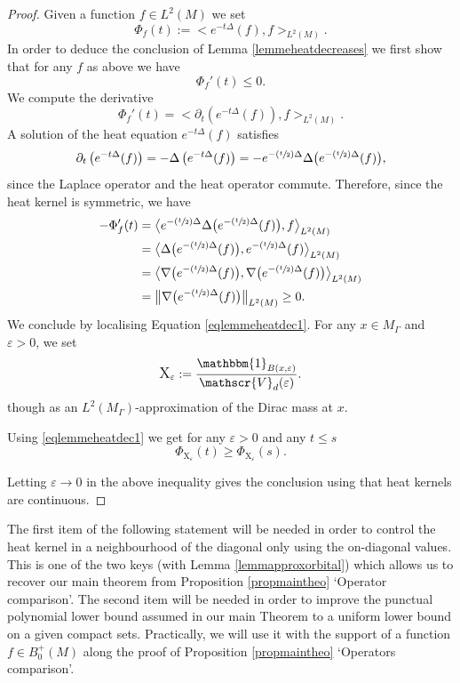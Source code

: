 \documentclass[10pt]{amsart}
\let\mathcal\mathscr
\let\epsilon\varepsilon
\newcommand{\Psfrac}[2]{(\sfrac{#1}{#2})}
\theoremstyle{plain}
\theoremstyle{definition}
\begin{document}
\begin{proof}
Given a function $f \in L^2(M)$ we set
\[
\Phi_f(t) := \bigl< e^{-t\Delta}(f),f \bigr>_{L^2(M)}.
\]
In order to deduce the conclusion of Lemma \ref{lemmeheatdecreases} we first show that for any $f$ as above we have
\begin{equation}
\label{eqlemmeheatdec1}
\Phi_f'(t) \le 0.
\end{equation}
We compute the derivative
\[
\Phi_f'(t) = \bigl< \partial_t \left(e^{-t\Delta} (f)\right),f \bigr>_{L^2(M)}.
\]
A solution of the heat equation $e^{-t\Delta} (f)$ satisfies
\[
\partial_t \left(e^{-t\Delta} (f) \right) = - \Delta \left(e^{-t\Delta} (f) \right) = - e^{-\Psfrac{t}{2} \Delta} \Delta \bigl(e^{-\Psfrac{t}{2}\Delta} (f) \bigr),
\]
since the Laplace operator and the heat operator commute. Therefore, since the heat kernel is symmetric, we have
\begin{align*}
- \Phi_f'(t) & = \bigl< e^{-\Psfrac{t}{2} \Delta} \Delta\bigl(e^{-\Psfrac{t}{2} \Delta}(f) \bigr),f \bigr>_{L^2(M)} \\
& = \bigl< \Delta \bigl(e^{-\Psfrac{t}{2} \Delta}(f) \bigr), e^{-\Psfrac{t}{2} \Delta}(f) \bigr>_{L^2(M)} \\
& = \bigl< \nabla \bigl(e^{-\Psfrac{t}{2} \Delta}(f) \bigr), \nabla \bigl(e^{-\Psfrac{t}{2} \Delta}(f) \bigr) \bigr>_{L^2(M)} \\
& = \bigl\Vert \nabla \bigl(e^{-\Psfrac{t}{2} \Delta}(f) \bigr) \bigr\Vert_{L^2(M)} \ge 0.
\end{align*}
We conclude by localising Equation \eqref{eqlemmeheatdec1}. For any $x \in M_{\Gamma}$ and $\epsilon > 0$, we set
\[
\text{\large{X}}_{\epsilon} := \frac{\mathbbm{1}_{B(x,\epsilon)}}{\mathcal{V}_d(\epsilon)}.
\]
though as an $L^2(M_{\Gamma})$-approximation of the Dirac mass at $x$.

Using \eqref{eqlemmeheatdec1} we get for any $\epsilon > 0$ and any $t \le s$
\[
\Phi_{\text{{X}}_{\epsilon}}(t) \ge \Phi_{\text{{X}}_{\epsilon}}(s).
\]

Letting $\epsilon \to 0$ in the above inequality gives the conclusion using that heat kernels are continuous.
\end{proof}

The first item of the following statement will be needed in order to control the heat kernel in a neighbourhood of the diagonal only using the on-diagonal values. This is one of the two keys (with Lemma \ref{lemmapproxorbital}) which allows us to recover our main theorem from Proposition \ref{propmaintheo} `Operator comparison'. The second item will be needed in order to improve the punctual polynomial lower bound assumed in our main Theorem to a uniform lower bound on a given compact sets. Practically, we will use it with the support of a function $f \in B^+_0(M)$ along the proof of Proposition \ref{propmaintheo} `Operators comparison'.
\end{document}
